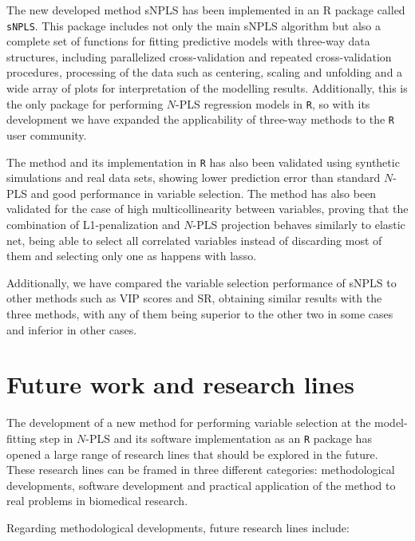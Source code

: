 The new developed method sNPLS has been implemented in an R package called \texttt{sNPLS}. This package includes not only the main sNPLS algorithm but also a complete set of functions for fitting predictive models with three-way data structures, including parallelized cross-validation and repeated cross-validation procedures, processing of the data such as centering, scaling and unfolding and a wide array of plots for interpretation of the modelling results. Additionally, this is the only package for performing $N$-PLS regression models in \texttt{R}, so with its development we have expanded the applicability of three-way methods to the \texttt{R} user community.

The method and its implementation in \texttt{R} has also been validated using synthetic simulations and real data sets, showing lower prediction error than standard $N$-PLS and good performance in variable selection. The method has also been validated for the case of high multicollinearity between variables, proving that the combination of L1-penalization and $N$-PLS projection behaves similarly to elastic net, being able to select all correlated variables instead of discarding most of them and selecting only one as happens with lasso. 

Additionally, we have compared the variable selection performance of sNPLS to other methods such as VIP scores and SR, obtaining similar results with the three methods, with any of them being superior to the other two in some cases and inferior in other cases.

\section{Future work and research lines}
The development of a new method for performing variable selection at the model-fitting step in $N$-PLS and its software implementation as an \texttt{R} package has opened a large range of research lines that should be explored in the future. These research lines can be framed in three different categories: methodological developments, software development and practical application of the method to real problems in biomedical research.

Regarding methodological developments, future research lines include:


